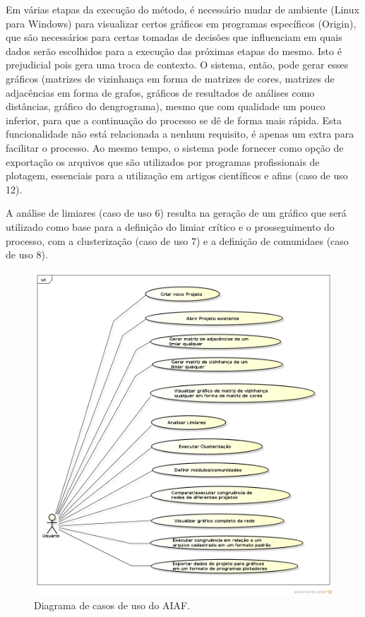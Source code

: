 Em várias etapas da execução do método, é necessário mudar de ambiente (Linux para Windows) para visualizar certos gráficos em programas específicos (Origin),
que são necessários para certas tomadas de decisões que influenciam em quais dados serão escolhidos para a execução das próximas etapas do mesmo. Isto é
prejudicial pois gera uma troca de contexto. O sistema, então, pode gerar esses gráficos (matrizes de vizinhança em forma de matrizes de cores, matrizes de
adjacências em forma de grafos, gráficos de resultados de análises como distâncias, gráfico do dengrograma), mesmo que com qualidade um pouco inferior,
para que a continuação do processo se dê de forma mais rápida. Esta funcionalidade não está relacionada a nenhum requisito, é apenas um extra para
facilitar o processo. Ao mesmo tempo, o sistema pode fornecer como opção de exportação os arquivos que são utilizados por
programas profissionais de plotagem, essenciais para a utilização em artigos científicos e afins (caso de uso 12).

A análise de limiares (caso de uso 6) resulta na geração de um gráfico que será utilizado como base para a definição do limiar crítico e o prosseguimento
do processo, com a clusterização (caso de uso 7) e a definição de comunidaes (caso de uso 8).

\begin{figure}
\centering
\includegraphics[scale=0.52]{diagrama-casos-de-uso}
\caption{Diagrama de casos de uso do AIAF.}
\label{fig:casos-uso}
\end{figure}

